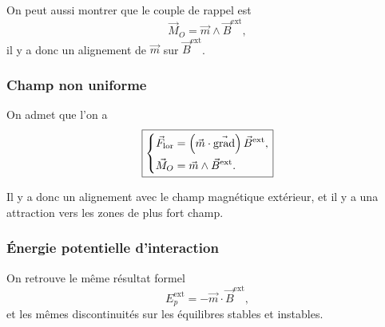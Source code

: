 On peut aussi montrer que le couple de rappel est
\begin{equation}
    \boxed{
        \vec{M}_O=\vec{m}\wedge\vec{B}^{\mathrm{ext}},
    }
\end{equation}
il y a donc un alignement de $\vec{m}$ sur $\vec{B}^{\mathrm{ext}}$.

\subsubsection{Champ non uniforme}
On admet que l'on a 
\begin{equation}
    \boxed{
        \left\lbrace
    \begin{aligned}
        \vec{F}_{\mathrm{lor}}&=\left(\vec{m}\cdot\vec{\mathrm{grad}}\right)\vec{B}^{\mathrm{ext}},\\
        \vec{M}_O&=\vec{m}\wedge\vec{B}^{\mathrm{ext}}.
    \end{aligned}
    \right.}
\end{equation}

Il y a donc un alignement avec le champ magnétique extérieur, et il y a una attraction vers les zones de plus fort champ.

\subsubsection{Énergie potentielle d'interaction}

On retrouve le même résultat formel
\begin{equation}
    \boxed{
        E_p^{\mathrm{ext}}=-\vec{m}\cdot\vec{B}^{\mathrm{ext}},
    }
\end{equation}
et les mêmes discontinuités sur les équilibres stables et instables.